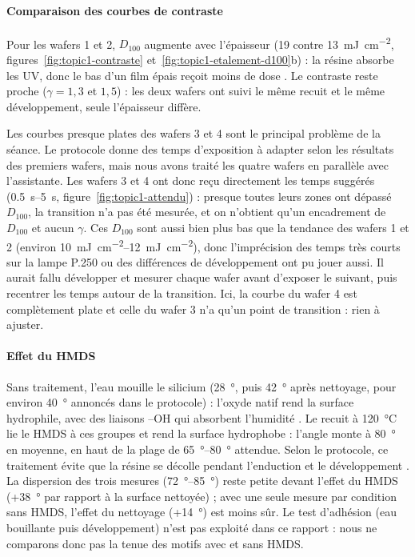 \paragraph{Comparaison des courbes de contraste}

Pour les wafers 1 et 2, $D_{100}$ augmente avec l'épaisseur (\num{19} contre \qty{13}{\milli\joule\per\centi\metre\squared}, figures~\ref{fig:topic1-contraste} et~\ref{fig:topic1-etalement-d100}b) : la résine absorbe les UV, donc le bas d'un film épais reçoit moins de dose \cite{intro}. Le contraste reste proche ($\gamma = 1{,}3$ et $1{,}5$) : les deux wafers ont suivi le même recuit et le même développement, seule l'épaisseur diffère.

Les courbes presque plates des wafers 3 et 4 sont le principal problème de la séance. Le protocole donne des temps d'exposition à adapter selon les résultats des premiers wafers, mais nous avons traité les quatre wafers en parallèle avec l'assistante. Les wafers 3 et 4 ont donc reçu directement les temps suggérés (\qtyrange{0,5}{5}{\second}, figure~\ref{fig:topic1-attendu}) : presque toutes leurs zones ont dépassé $D_{100}$, la transition n'a pas été mesurée, et on n'obtient qu'un encadrement de $D_{100}$ et aucun $\gamma$. Ces $D_{100}$ sont aussi bien plus bas que la tendance des wafers 1 et 2 (environ \qtyrange{10}{12}{\milli\joule\per\centi\metre\squared}), donc l'imprécision des temps très courts sur la lampe P.250 ou des différences de développement ont pu jouer aussi. Il aurait fallu développer et mesurer chaque wafer avant d'exposer le suivant, puis recentrer les temps autour de la transition. Ici, la courbe du wafer 4 est complètement plate et celle du wafer 3 n'a qu'un point de transition : rien à ajuster.

\paragraph{Effet du HMDS}

Sans traitement, l'eau mouille le silicium (\qty{28}{\degree}, puis \qty{42}{\degree} après nettoyage, pour environ \qty{40}{\degree} annoncés dans le protocole) : l'oxyde natif rend la surface hydrophile, avec des liaisons --OH qui absorbent l'humidité \cite{intro}. Le recuit à \qty{120}{\celsius} lie le HMDS à ces groupes  et rend la surface hydrophobe : l'angle monte à \qty{80}{\degree} en moyenne, en haut de la plage de \qtyrange{65}{80}{\degree} attendue. Selon le protocole, ce traitement évite que la résine se décolle pendant l'enduction et le développement \cite{prot1}. La dispersion des trois mesures (\qtyrange{72}{85}{\degree}) reste petite devant l'effet du HMDS (+\qty{38}{\degree} par rapport à la surface nettoyée) ; avec une seule mesure par condition sans HMDS, l'effet du nettoyage (+\qty{14}{\degree}) est moins sûr. Le test d'adhésion (eau bouillante puis développement) n'est pas exploité dans ce rapport : nous ne comparons donc pas la tenue des motifs avec et sans HMDS.

